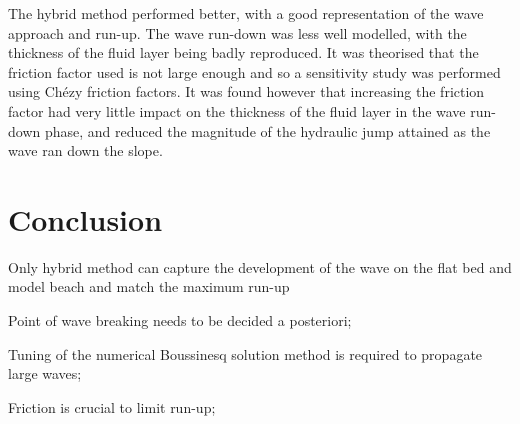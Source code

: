 The hybrid method performed better, with a good representation of the wave
approach and run-up.  The wave run-down was less well modelled, with the
thickness of the fluid layer being badly reproduced. It was theorised that the
friction factor used is not large enough and so a sensitivity study was
performed using Chézy friction factors. It was found however that increasing
the friction factor had very little impact on the thickness of the fluid layer
in the wave run-down phase, and reduced the magnitude of the hydraulic jump
attained as the wave ran down the slope.

\section{Conclusion}

Only hybrid method can capture the development of the wave on the flat bed and
model beach and match the maximum run-up

Point of wave breaking needs to be decided a posteriori;

Tuning of the numerical Boussinesq solution method is required to propagate large waves;

Friction is crucial to limit run-up;
